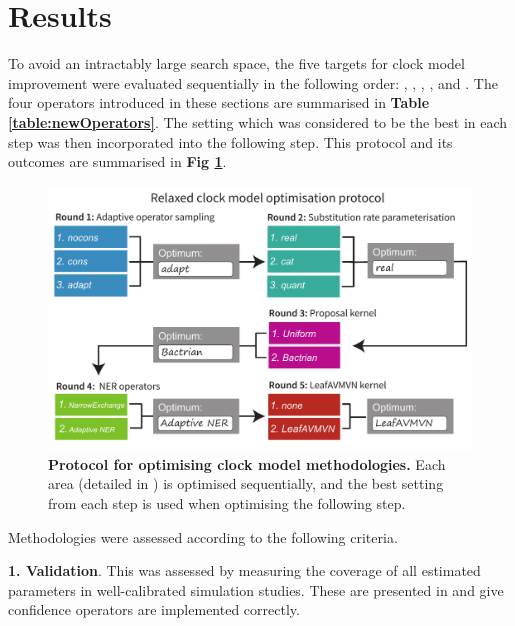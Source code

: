 \documentclass[10pt,letterpaper]{article}
\begin{document}
\clearpage
\section*{Results} \label{sect:results}





To avoid an intractably large search space, the five targets for clock model improvement were evaluated sequentially in the following order: \textbf{}, \textbf{}, \textbf{}, \textbf{}, and \textbf{}.
The four operators introduced in these sections are summarised in \textbf{Table \ref{table:newOperators}}.
The setting which was considered to be the best in each step was then incorporated into the following step. 
This protocol and its outcomes are summarised in \textbf{Fig \ref{fig:tournament}}.





\begin{figure}[!h]
\includegraphics[width=\textwidth]{Figures/tournament.pdf}
\caption{\textbf{Protocol for optimising clock model methodologies.} Each area (detailed in \textbf{}) is optimised sequentially, and the best setting from each step is used when optimising the following step.}
\label{fig:tournament}
\end{figure}


Methodologies were assessed according to the following criteria.


\textbf{1. Validation}. This was assessed by measuring the coverage of all estimated parameters in well-calibrated simulation studies. 
These are presented in \textbf{} and give confidence operators are implemented correctly. \\
\end{document}
